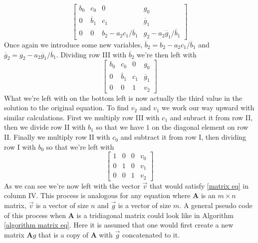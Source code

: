 \documentclass[english,notitlepage]{revtex4-1}  %
\begin{document}
\begin{equation}
    \begin{bmatrix}
        b_0 & c_0 & 0 & g_0 \\
        0 & \overline{b}_1 & c_1 & \overline{g}_1 \\
        0 & 0 & b_2 - a_2c_1/\overline{b}_1 & g_2 - a_2\overline{g}_1/\overline{b}_1
    \end{bmatrix}
\end{equation}
Once again we introduce some new variables, $\overline{b}_2 = b_2 - a_2c_1/\overline{b}_1$ and $\overline{g}_2 = g_2 - a_2\overline{g}_1/\overline{b}_1$. Dividing row III with $\overline{b}_2$ we're then left with
\begin{equation}
    \begin{bmatrix}
        b_0 & c_0 & 0 & g_0 \\
        0 & \overline{b}_1 & c_1 & \overline{g}_1 \\
        0 & 0 & 1 & v_2
    \end{bmatrix}
\end{equation}
What we're left with on the bottom left is now actually the third value in the solution to the original equation. To find $v_2$ and $v_1$ we work our way upward with similar calculations. First we multiply row III with $c_1$ and subract it from row II, then we divide row II with $b_1$ so that we have $1$ on the diagonal element on row II. Finally we multiply row II with $c_0$ and subtract it from row I, then dividing row I with $b_0$ so that we're left with
\begin{equation}
    \begin{bmatrix}
        1 & 0 & 0 & v_0 \\
        0 & 1 & 0 & v_1 \\
        0 & 0 & 1 & v_2
    \end{bmatrix}
\end{equation}
As we can see we're now left with the vector $\vec{v}$ that would satisfy \eqref{matrix eq} in column IV. This process is analogous for any equation where $\textbf{A}$ is an $m \times n$ matrix, $\vec{v}$ is a vector of size $n$ and $\vec{g}$ is a vector of size $m$. A general pseudo code of this process when $\textbf{A}$ is a tridiagonal matrix could look like in Algorithm \ref*{algorithm matrix eq}. Here it is assumed that one would first create a new matrix $\textbf{A}g$ that is a copy of $\textbf{A}$ with $\vec{g}$ concatenated to it.
\end{document}
